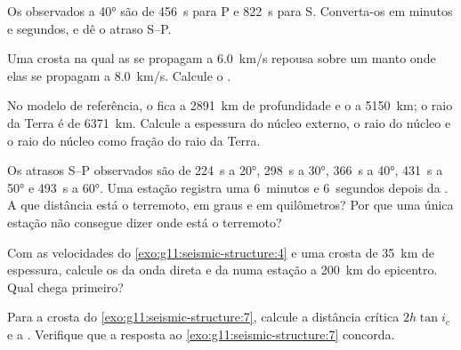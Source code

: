 \begin{exercise}[$\star$]\label{exo:g11:seismic-structure:3}
Os  observados a \ang{40} são de \qty{456}{s} para P e
\qty{822}{s} para S. Converta-os em minutos e segundos, e dê o atraso S--P.
\end{exercise}

\begin{exercise}[$\star$]\label{exo:g11:seismic-structure:4}
Uma crosta na qual as  se propagam a \qty{6.0}{km/s} repousa sobre um
manto onde elas se propagam a \qty{8.0}{km/s}. Calcule o .
\end{exercise}

\begin{exercise}[$\star$]\label{exo:g11:seismic-structure:5}
No modelo de referência, o  fica a \qty{2891}{km} de
profundidade e o  a \qty{5150}{km}; o raio da Terra
é de \qty{6371}{km}. Calcule a espessura do núcleo externo, o raio do núcleo
e o raio do núcleo como fração do raio da Terra.
\end{exercise}

\begin{exercise}[$\star\star$]\label{exo:g11:seismic-structure:6}
Os atrasos S--P observados são de \qty{224}{s} a \ang{20}, \qty{298}{s} a
\ang{30}, \qty{366}{s} a \ang{40}, \qty{431}{s} a \ang{50} e
\qty{493}{s} a \ang{60}. Uma estação registra uma  6~minutos e
6~segundos depois da . A que distância está o terremoto, em graus e
em quilômetros? Por que uma única estação não consegue dizer onde está o
terremoto?
\end{exercise}

\begin{exercise}[$\star\star$]\label{exo:g11:seismic-structure:7}
Com as velocidades do \cref{exo:g11:seismic-structure:4} e uma crosta de
\qty{35}{km} de espessura, calcule os  da onda direta e
da  numa estação a \qty{200}{km} do epicentro. Qual chega
primeiro?
\end{exercise}

\begin{exercise}[$\star\star$]\label{exo:g11:seismic-structure:8}
Para a crosta do \cref{exo:g11:seismic-structure:7}, calcule a distância
crítica $2h\tan i_c$ e a . Verifique que a resposta ao
\cref{exo:g11:seismic-structure:7} concorda.
\end{exercise}

